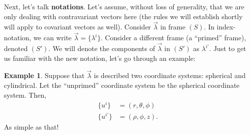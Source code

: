 \documentclass{article}
\theoremstyle{definition}
\newtheorem{exmp}{Example}[section]
\begin{document}
Next, let's talk \textbf{notations}. Let's assume, without loss of generality, that we are only dealing with contravariant vectors here (the rules we will establish shortly will apply to covariant vectors as well). Consider $\vec{\lambda}$ in frame $(S)$. In index-notation, we can write $\vec{\lambda} = \{\lambda^i\}$. Consider a different frame (a ``primed'' frame), denoted $(S')$. We will denote the components of $\vec{\lambda}$ in $(S')$ as $\lambda^{i'}$. Just to get us familiar with the new notation, let's go through an example:
\begin{exmp}
Suppose that $\vec{\lambda}$ is described two coordinate systems: spherical and cylindrical. Let the ``unprimed'' coordinate system be the spherical coordinate system. Then,
\begin{align*}
\{u^i\} &= (r,\theta,\phi)\\
\{u^{i'}\} &= (\rho, \phi, z).
\end{align*}
As simple as that!
\end{exmp}
\end{document}

